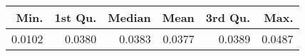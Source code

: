 \begin{table}[ht]
\centering
\begin{tabular}{rrrrrr}
  \hline
Min. & 1st Qu. & Median & Mean & 3rd Qu. & Max. \\ 
  \hline
0.0102 & 0.0380 & 0.0383 & 0.0377 & 0.0389 & 0.0487 \\ 
   \hline
\end{tabular}
\end{table}
